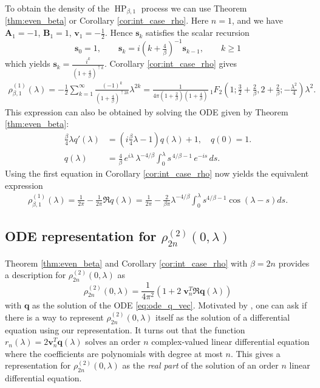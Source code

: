 \documentclass[12pt]{article}
\theoremstyle{definition} %
\theoremstyle{remark} %
\begin{document}
To obtain the density of the $\operatorname{HP}_{\beta,1}$ process we can use Theorem \ref{thm:even_beta} or Corollary \ref{cor:int_case_rho}. Here $n=1$, and we have $\mathbf{A}_1=-1$, $\mathbf{B}_1=1$, $\mathbf{v}_1=-\tfrac{1}{2}$.  Hence  $\mathbf{s}_k$ satisfies the scalar recursion 
\[
\mathbf{s}_0=1, \qquad \mathbf{s}_k=i (k+\tfrac{4}{\beta})^{-1} \mathbf{s}_{k-1}, \qquad k\ge 1
\]
which yields $\mathbf{s}_k=\frac{i^k}{\left(1+\tfrac{4}{\beta}\right)^{\uparrow k}}$.  Corollary \ref{cor:int_case_rho} gives
\begin{align}
   \rho_{\beta,1}^{(1)}(\lambda)=-\frac12 \sum_{k=1}^\infty \frac{(-1)^k }{\left(1+\tfrac{4}{\beta}\right)^{\uparrow 2k}}
   \lambda^{2k}
   =
   \frac{1 }{4 \pi (1+ \frac{2}{\beta}) (1+\frac{4}{\beta})} \, _1F_2\left(1;\frac{3}{2}+\frac{2}{\beta },2+\frac{2}{\beta };-\frac{\lambda ^2}{4}\right) \lambda ^2.
\end{align}
This expression can also be obtained by solving the ODE given by  Theorem \ref{thm:even_beta}:
\begin{align*}
    \tfrac{\beta}{4}\lambda q'(\lambda) &= (i\tfrac{\beta}{4} \lambda -1) q(\lambda) + 1 , \quad q(0) = 1.\\
    q(\lambda)
&= \frac{4}{\beta}\,e^{i\lambda}\,\lambda^{-4/\beta}
\int_{0}^{\lambda} s^{\,4/\beta - 1}\,e^{-i s}\,ds.
\end{align*}
Using the first equation in Corollary \ref{cor:int_case_rho} now yields the equivalent expression
\begin{align*}
     \rho_{\beta,1}^{(1)}(\lambda) = \frac{1}{2\pi}-\frac{1}{2\pi}\Re{q(\lambda)}=
\frac{1}{2\pi}-\frac{2}{\beta \pi}\lambda^{-4/\beta} \int_0^\lambda s^{4/\beta-1} \cos(\lambda-s) ds.
\end{align*}



\subsection{ODE representation for $\rho_{2n}^{(2)}(0,\lambda)$}

Theorem \ref{thm:even_beta} and Corollary \ref{cor:int_case_rho} with $\beta=2n$ provides a description for $\rho_{2n}^{(2)}(0,\lambda)$ as 
\[
\rho_{2n}^{(2)}(0,\lambda)=\frac{1}{4\pi^2}\left(1+2\;\mathbf{v}_n^T\Re \mathbf{q}(\lambda)\right)
\]
with $\mathbf{q}$ as the solution of the ODE \eqref{eq:ode_q_vec}. Motivated by \cite{Forrester_20212}, one can ask if there is a way to represent $\rho_{2n}^{(2)}(0,\lambda)$ itself as the solution of a differential equation using our representation. It turns out that the function $r_n(\lambda)=2 \mathbf{v}_n^T \mathbf{q}(\lambda)$ solves an order $n$ complex-valued linear differential equation where the coefficients are polynomials with degree at most $n$. This gives a representation for  $\rho_{2n}^{(2)}(0,\lambda)$ as the \emph{real part} of the solution of an order $n$  linear differential equation. 
\end{document}
